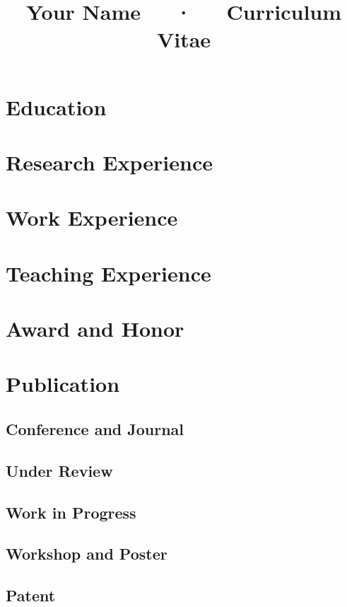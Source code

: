 \documentclass{modularcv}
\title{Your Name~~~·~~~Curriculum Vitae}
\begin{document}
\makecvheader
\makefooter
\section{Education}\makeEducation
\section{Research Experience}\makeResearchExperience
\section{Work Experience}\makeWorkExperience
\section{Teaching Experience}\makeTeaching
\section{Award and Honor}\makeAward
\section{Publication}
\subsection{Conference and Journal}
\subsection{Under Review}
\subsection{Work in Progress}
\subsection{Workshop and Poster}
\subsection{Patent}
\end{document}
